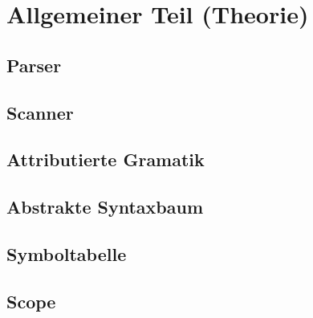 

\section{Allgemeiner Teil (Theorie)}

\subsection{Parser}

\subsection{Scanner}

\subsection{Attributierte Gramatik}

\subsection{Abstrakte Syntaxbaum}

\subsection{Symboltabelle}

\subsection{Scope}
